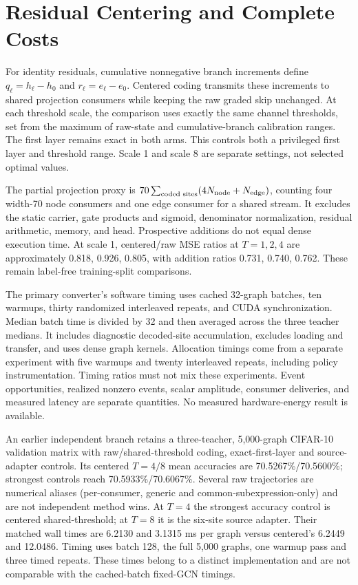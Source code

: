 \documentclass[10pt,twocolumn,letterpaper]{article}
\begin{document}
\section{Residual Centering and Complete Costs}
For identity residuals, cumulative nonnegative branch increments define $q_\ell=h_\ell-h_0$ and $r_\ell=e_\ell-e_0$. Centered coding transmits these increments to shared projection consumers while keeping the raw graded skip unchanged. At each threshold scale, the comparison uses exactly the same channel thresholds, set from the maximum of raw-state and cumulative-branch calibration ranges. The first layer remains exact in both arms. This controls both a privileged first layer and threshold range. Scale 1 and scale 8 are separate settings, not selected optimal values.

The partial projection proxy is $70\sum_{\text{coded sites}}(4N_{\rm node}+N_{\rm edge})$, counting four width-70 node consumers and one edge consumer for a shared stream. It excludes the static carrier, gate products and sigmoid, denominator normalization, residual arithmetic, memory, and head. Prospective additions do not equal dense execution time. At scale 1, centered/raw MSE ratios at $T=1,2,4$ are approximately 0.818, 0.926, 0.805, with addition ratios 0.731, 0.740, 0.762. These remain label-free training-split comparisons.

The primary converter's software timing uses cached 32-graph batches, ten warmups, thirty randomized interleaved repeats, and CUDA synchronization. Median batch time is divided by 32 and then averaged across the three teacher medians. It includes diagnostic decoded-site accumulation, excludes loading and transfer, and uses dense graph kernels. Allocation timings come from a separate experiment with five warmups and twenty interleaved repeats, including policy instrumentation. Timing ratios must not mix these experiments. Event opportunities, realized nonzero events, scalar amplitude, consumer deliveries, and measured latency are separate quantities. No measured hardware-energy result is available.


An earlier independent branch retains a three-teacher, 5,000-graph CIFAR-10 validation matrix with raw/shared-threshold coding, exact-first-layer and source-adapter controls. Its centered $T=4/8$ mean accuracies are 70.5267\%/70.5600\%; strongest controls reach 70.5933\%/70.6067\%. Several raw trajectories are numerical aliases (per-consumer, generic and common-subexpression-only) and are not independent method wins. At $T=4$ the strongest accuracy control is centered shared-threshold; at $T=8$ it is the six-site source adapter. Their matched wall times are 6.2130 and 3.1315 ms per graph versus centered's 6.2449 and 12.0486. Timing uses batch 128, the full 5,000 graphs, one warmup pass and three timed repeats. These times belong to a distinct implementation and are not comparable with the cached-batch fixed-GCN timings.
\end{document}
